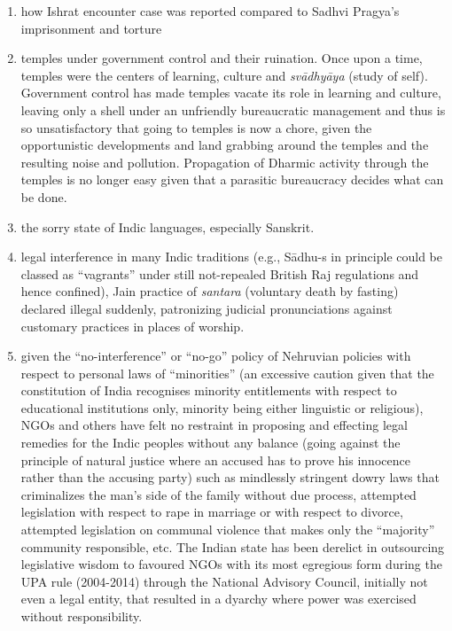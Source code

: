 {
\begin{enumerate}
\item how Ishrat encounter case was reported compared to Sadhvi Pragya’s imprisonment and torture
\item temples under government control and their ruination. Once upon a time, temples were the centers of learning, culture and {\sl svādhyāya} (study of self). Government control has made temples vacate its role in learning and culture, leaving only a shell under an unfriendly  bureaucratic management and thus is so unsatisfactory that going to temples is now a chore, given the opportunistic developments and land grabbing around the temples and the resulting noise and pollution. Propagation of Dharmic activity through the temples is no longer easy given that a parasitic bureaucracy decides what can be done.
\item the sorry state of Indic languages, especially Sanskrit.
\item legal interference in many Indic traditions (e.g., Sādhu-s in principle could be classed as “vagrants” under still not-repealed British Raj regulations and hence confined), Jain practice of {\sl santara} (voluntary death by fasting) declared illegal suddenly, patronizing judicial pronunciations against customary practices in places of worship.
\item given the “no-interference” or “no-go” policy of Nehruvian policies with respect to personal laws of “minorities” (an excessive caution given that the constitution of India recognises minority entitlements with respect to educational institutions only, minority being either linguistic or religious), NGOs and others have felt no restraint in proposing and effecting legal remedies for the Indic peoples without any balance (going against the principle of natural justice where an accused has to prove his innocence rather than the accusing party) such as mindlessly stringent dowry laws that criminalizes the man’s side of the family without due process, attempted legislation with respect to rape in marriage or with respect to divorce, attempted legislation on communal violence that makes only the “majority” community responsible, etc. The Indian state has been derelict in outsourcing legislative wisdom to favoured NGOs with its most egregious form during the UPA rule (2004-2014) through the National Advisory Council, initially not even a legal entity, that resulted in a dyarchy where power was exercised without responsibility.
\end{enumerate}}

